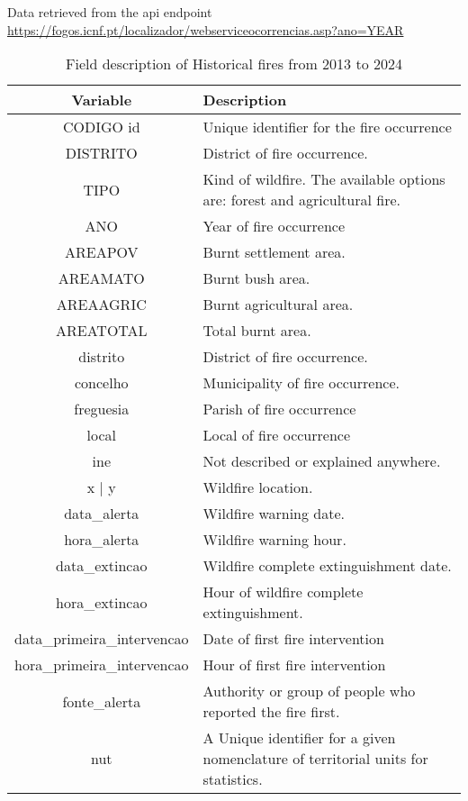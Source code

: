Data retrieved from the api endpoint \url{https://fogos.icnf.pt/localizador/webserviceocorrencias.asp?ano=YEAR}
\begin{table}[h!]
\caption{Field description of Historical fires from 2013 to 2024}
\label{forest_inventory}
\centering
\small
\begin{tabular}{|c|p{7.5cm}|} %
\hline
\textbf{Variable} & \textbf{Description}\\
\hline
CODIGO id  & Unique identifier for the fire occurrence \\
\hline
DISTRITO  & District of fire occurrence. \\
\hline
TIPO  & Kind of wildfire. The available options are: forest and agricultural fire.\\
\hline
ANO  & Year of fire occurrence \\
\hline
AREAPOV & Burnt settlement area. \\
\hline
AREAMATO & Burnt bush area.  \\
\hline
AREAAGRIC & Burnt agricultural area. \\
\hline
AREATOTAL & Total burnt area. \\
\hline

distrito  & District of fire occurrence. \\
\hline
concelho  & Municipality of fire occurrence. \\
\hline
freguesia  & Parish of fire occurrence\\
\hline
local  & Local of fire occurrence \\
\hline
ine  & Not described or explained anywhere. \\
\hline
x | y  & Wildfire location. \\
\hline
data\_alerta  & Wildfire warning date. \\
\hline
hora\_alerta  & Wildfire warning hour. \\
\hline
data\_extincao & Wildfire complete extinguishment date. \\
\hline
hora\_extincao & Hour of wildfire complete extinguishment. \\
\hline
data\_primeira\_intervencao & Date of first fire intervention \\
\hline
hora\_primeira\_intervencao & Hour of first fire intervention \\
\hline
fonte\_alerta & Authority or group of people who reported the fire first. \\
\hline
nut & A Unique identifier for a given nomenclature of territorial units for statistics. \\
\hline




\end{tabular}
\end{table}
